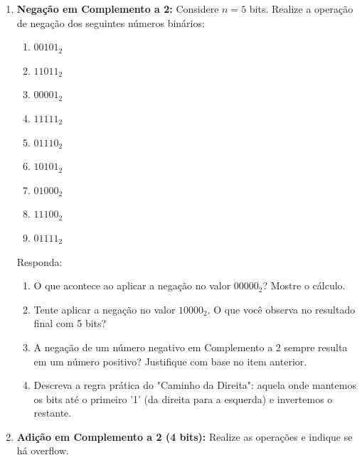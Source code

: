 \begin{enumerate}
          Responda:
          \begin{enumerate}
              \item Qual o valor decimal representado pelo binário $10000_2$? Por que ele é considerado um caso especial na representação de 5 bits?
              \item Como o bit mais significativo (MSB) ajuda a determinar o sinal do número antes mesmo de realizar o cálculo?
              \item Ao converter o binário $11111_2$, qual valor decimal é obtido?
          \end{enumerate}
    \item \textbf{Negação em Complemento a 2:}
          Considere $n = 5$ bits. Realize a operação de negação dos seguintes números binários:
          \begin{enumerate}
              \item $00101_2$
              \item $11011_2$
              \item $00001_2$
              \item $11111_2$
              \item $01110_2$
              \item $10101_2$
              \item $01000_2$
              \item $11100_2$
              \item $01111_2$
          \end{enumerate}

          Responda:
          \begin{enumerate}
              \item O que acontece ao aplicar a negação no valor $00000_2$? Mostre o cálculo.
              \item Tente aplicar a negação no valor $10000_2$. O que você observa no resultado final com 5 bits?
              \item A negação de um número negativo em Complemento a 2 sempre resulta em um número positivo? Justifique com base no item anterior.
              \item Descreva a regra prática do "Caminho da Direita": aquela onde mantemos os bits até o primeiro '1' (da direita para a esquerda) e invertemos o restante.
          \end{enumerate}

    \item \textbf{Adição em Complemento a 2 (4 bits):}
          Realize as operações e indique se há overflow.


\end{enumerate}
